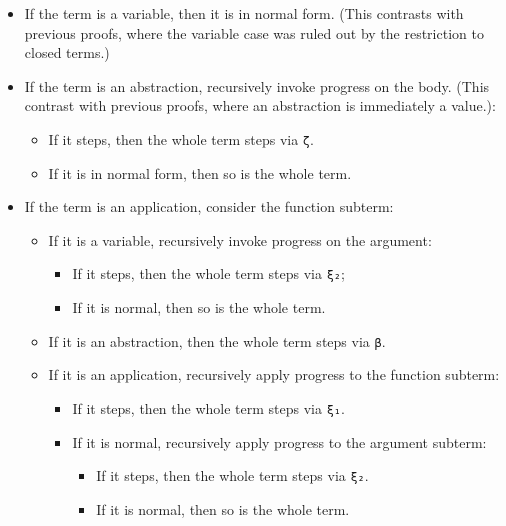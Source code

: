 \begin{itemize}
\tightlist
\item
  If the term is a variable, then it is in normal form. (This contrasts
  with previous proofs, where the variable case was ruled out by the
  restriction to closed terms.)
\item
  If the term is an abstraction, recursively invoke progress on the
  body. (This contrast with previous proofs, where an abstraction is
  immediately a value.):

  \begin{itemize}
  \tightlist
  \item
    If it steps, then the whole term steps via \texttt{ζ}.
  \item
    If it is in normal form, then so is the whole term.
  \end{itemize}
\item
  If the term is an application, consider the function subterm:

  \begin{itemize}
  \tightlist
  \item
    If it is a variable, recursively invoke progress on the argument:

    \begin{itemize}
    \tightlist
    \item
      If it steps, then the whole term steps via \texttt{ξ₂};
    \item
      If it is normal, then so is the whole term.
    \end{itemize}
  \item
    If it is an abstraction, then the whole term steps via \texttt{β}.
  \item
    If it is an application, recursively apply progress to the function
    subterm:

    \begin{itemize}
    \tightlist
    \item
      If it steps, then the whole term steps via \texttt{ξ₁}.
    \item
      If it is normal, recursively apply progress to the argument
      subterm:

      \begin{itemize}
      \tightlist
      \item
        If it steps, then the whole term steps via \texttt{ξ₂}.
      \item
        If it is normal, then so is the whole term.
      \end{itemize}
    \end{itemize}
  \end{itemize}
\end{itemize}

